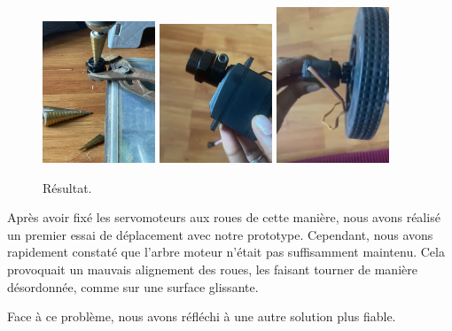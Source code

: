 \documentclass[a4paper,12pt]{report}  %
\begin{document}
\begin{figure}[H]
	\centering
	\includegraphics[width=0.3\textwidth]{./attachments/fixage-1.png}
	\includegraphics[width=0.3\textwidth]{./attachments/fixage-2.png}
	\includegraphics[width=0.3\textwidth]{./attachments/fixage-3.png}
	
	\caption{Résultat.}
\end{figure}



Après avoir fixé les servomoteurs aux roues de cette manière, nous avons réalisé un premier essai de déplacement avec notre prototype. Cependant, nous avons rapidement constaté que l’arbre moteur n’était pas suffisamment maintenu. Cela provoquait un mauvais alignement des roues, les faisant tourner de manière désordonnée, comme sur une surface glissante.

Face à ce problème, nous avons réfléchi à une autre solution plus fiable.
\end{document}
